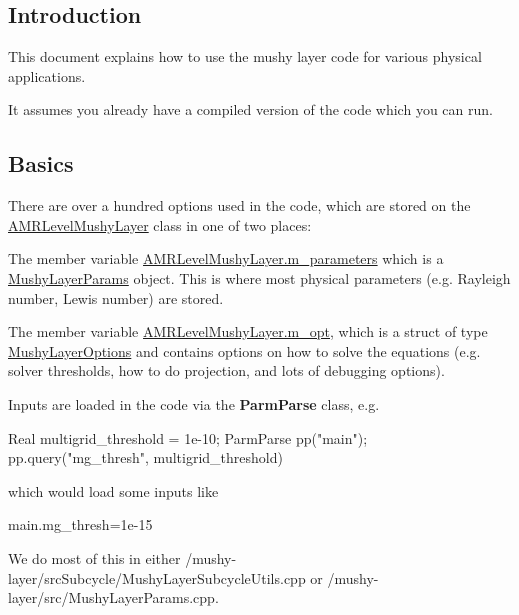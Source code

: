 \subsection*{Introduction}

This document explains how to use the mushy layer code for various physical applications.

It assumes you already have a compiled version of the code which you can run.

\subsection*{Basics}

There are over a hundred options used in the code, which are stored on the {\ttfamily \hyperlink{class_a_m_r_level_mushy_layer}{A\+M\+R\+Level\+Mushy\+Layer}} class in one of two places\+:


\begin{DoxyEnumerate}
\item The member variable {\ttfamily \hyperlink{class_a_m_r_level_mushy_layer_abe361484bd04d3be84f4c3a0c96d896d}{A\+M\+R\+Level\+Mushy\+Layer.\+m\+\_\+parameters}} which is a {\ttfamily \hyperlink{class_mushy_layer_params}{Mushy\+Layer\+Params}} object. This is where most physical parameters (e.\+g. Rayleigh number, Lewis number) are stored.
\item The member variable {\ttfamily \hyperlink{class_a_m_r_level_mushy_layer_a3652e6785ac8c5e429a5ac286ea3bc2e}{A\+M\+R\+Level\+Mushy\+Layer.\+m\+\_\+opt}}, which is a struct of type {\ttfamily \hyperlink{struct_mushy_layer_options}{Mushy\+Layer\+Options}} and contains options on how to solve the equations (e.\+g. solver thresholds, how to do projection, and lots of debugging options).
\end{DoxyEnumerate}

Inputs are loaded in the code via the {\ttfamily \textbf{ Parm\+Parse}} class, e.\+g.


\begin{DoxyCode}
Real multigrid\_threshold = 1e-10;
ParmParse pp(\textcolor{stringliteral}{"main"});
pp.query(\textcolor{stringliteral}{"mg\_thresh"}, multigrid\_threshold)
\end{DoxyCode}
 which would load some inputs like 
\begin{DoxyCode}
main.mg\_thresh=1e-15
\end{DoxyCode}


We do most of this in either {\ttfamily /mushy-\/layer/src\+Subcycle/\+Mushy\+Layer\+Subcycle\+Utils.cpp} or {\ttfamily /mushy-\/layer/src/\+Mushy\+Layer\+Params.cpp}.

